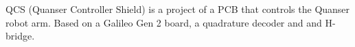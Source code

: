 Q\+CS (Quanser Controller Shield) is a project of a P\+CB that controls the Quanser robot arm. Based on a Galileo Gen 2 board, a quadrature decoder and and H-\/bridge. 
